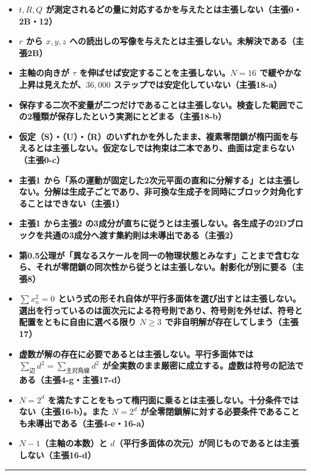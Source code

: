 \documentclass[
  10pt,
]{ltjsarticle}
\begin{document}
\begin{itemize}
\item
  \textbf{\(t, R, Q\)
  が測定されるどの量に対応するかを与えたとは主張しない（主張0・2B・12）}
\item
  \textbf{\(r\) から \(x,y,z\)
  への読出しの写像を与えたとは主張しない。未解決である（主張2B）}
\item
  \textbf{主軸の向きが \(\tau\)
  を伸ばせば安定することを主張しない。\(N=16\)
  で緩やかな上昇は見えたが、\(36{,}000\)
  ステップでは安定化していない（主張18-a）}
\item
  \textbf{保存する二次不変量が二つだけであることは主張しない。検査した範囲でこの2種類が保存したという実測にとどまる（主張18-b）}
\item
  \textbf{仮定（S）・（U）・（R）のいずれかを外したまま、複素零閉鎖が楕円面を与えるとは主張しない。仮定なしでは拘束は二本であり、曲面は定まらない（主張0-c）}
\item
  \textbf{主張1
  から「系の運動が固定した2次元平面の直和に分解する」とは主張しない。分解は生成子ごとであり、非可換な生成子を同時にブロック対角化することはできない（主張1）}
\item
  \textbf{主張1 から主張2
  の3成分が直ちに従うとは主張しない。各生成子の2Dブロックを共通の3成分へ渡す集約則は未導出である（主張2）}
\item
  \textbf{第0.5公理が「異なるスケールを同一の物理状態とみなす」ことまで含むなら、それが零閉鎖の同次性から従うとは主張しない。射影化が別に要る（主張8）}
\item
  \textbf{\(\sum x_n^2 = 0\)
  という式の形それ自体が平行多面体を選び出すとは主張しない。選出を行っているのは面次元による符号則であり、符号則を外せば、符号と配置をともに自由に選べる限り
  \(N\ge3\) で非自明解が存在してしまう（主張17）}
\item
  \textbf{虚数が解の存在に必要であるとは主張しない。平行多面体では
  \(\sum_{辺}d^2 = \sum_{主対角線}d^2\)
  が全実数のまま厳密に成立する。虚数は符号の記法である（主張4-g・主張17-d）}
\item
  \textbf{\(N = 2^d\)
  を満たすことをもって楕円面に乗るとは主張しない。十分条件ではない（主張16-b）。また
  \(N=2^d\)
  が全零閉鎖解に対する必要条件であることも未導出である（主張4-e・16-a）}
\item
  \textbf{\(N-1\)（主軸の本数）と
  \(d\)（平行多面体の次元）が同じものであるとは主張しない（主張16-d）}
\end{itemize}

\begin{center}\rule{0.5\linewidth}{0.5pt}\end{center}
\end{document}
